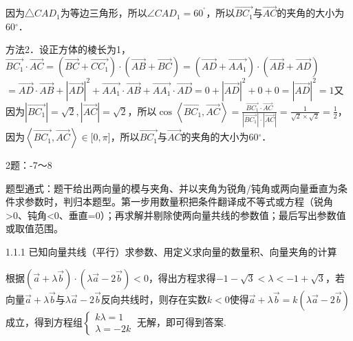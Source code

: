 因为△\(CAD_{1}\)为等边三角形，所以\(\angle CAD_{1} = 60^{{^\circ}}\)，所以\(\overrightarrow{BC_{1}}\)与\(\overrightarrow{AC}\)的夹角的大小为\(60{^\circ}\)．

方法2．设正方体的棱长为1，\(\overrightarrow{BC_{1}} \cdot \overrightarrow{AC} = \left( \overrightarrow{BC} + \overrightarrow{CC_{1}} \right) \cdot \left( \overrightarrow{AB} + \overrightarrow{BC} \right) = \left( \overrightarrow{AD} + \overrightarrow{AA_{1}} \right) \cdot \left( \overrightarrow{AB} + \overrightarrow{AD} \right)\)\(= \overrightarrow{AD} \cdot \overrightarrow{AB} + \left| \overrightarrow{AD} \right|^{2} + \overrightarrow{AA_{1}} \cdot \overrightarrow{AB} + \overrightarrow{AA_{1}} \cdot \overrightarrow{AD} = 0 + \left| \overrightarrow{AD} \right|^{2} + 0 + 0 = \left| \overrightarrow{AD} \right|^{2} = 1\)又因为\(\left| \overrightarrow{BC_{1}} \right| = \sqrt{2},\left| \overrightarrow{AC} \right| = \sqrt{2}\)，所以\(\cos\left\langle \overrightarrow{BC_{1}},\overrightarrow{AC} \right\rangle = \frac{\overrightarrow{BC_{1}} \cdot \overrightarrow{AC}}{\left| \overrightarrow{BC_{1}} \right| \cdot \left| \overrightarrow{AC} \right|} = \frac{1}{\sqrt{2} \times \sqrt{2}} = \frac{1}{2}\)，
因为\(\left\langle \overrightarrow{BC_{1}},\overrightarrow{AC} \right\rangle \in \lbrack 0,\pi\rbrack\)，所以\(\overrightarrow{BC_{1}}\)与\(\overrightarrow{AC}\)的夹角的大小为\(60{^\circ}\)．


2题：-7～8

题型通式：题干给出两向量的模与夹角、并以夹角为锐角/钝角或两向量垂直为条件求参数时，判归本题型。第一步用数量积把条件翻译成不等式或方程（锐角\textgreater0、钝角\textless0、垂直=0）；再求解并剔除使两向量共线的参数值；最后写出参数值或取值范围。


\noindent{}\quad{}1.1.1 已知向量共线（平行）求参数、用定义求向量的数量积、向量夹角的计算

根据\(\left( \overrightarrow{a} + \lambda\overrightarrow{b} \right) \cdot \left( \lambda\overrightarrow{a} - 2\overrightarrow{b} \right) < 0\)，得出方程求得\(- 1 - \sqrt{3} < \lambda < - 1 + \sqrt{3}\)，若向量\(\overrightarrow{a} + \lambda\overrightarrow{b}\)与\(\lambda\overrightarrow{a} - 2\overrightarrow{b}\)反向共线时，则存在实数\(k < 0\)使得\(\overrightarrow{a} + \lambda\overrightarrow{b} = k(\lambda\overrightarrow{a} - 2\overrightarrow{b})\)成立，得到方程组\(\left\{ \begin{array}{r}
k\lambda = 1 \\
\lambda = - 2k
\end{array} \right.\ \)无解，即可得到答案.

